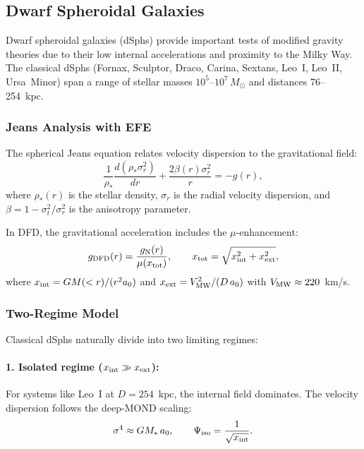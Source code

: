 \subsection{Dwarf Spheroidal Galaxies}\label{sec:galactic-dsph}

Dwarf spheroidal galaxies (dSphs) provide important tests of modified gravity theories due to their low internal accelerations and proximity to the Milky Way. The classical dSphs (Fornax, Sculptor, Draco, Carina, Sextans, Leo~I, Leo~II, Ursa~Minor) span a range of stellar masses $10^5$--$10^7\,M_\odot$ and distances 76--254~kpc.

\subsubsection{Jeans Analysis with EFE}

The spherical Jeans equation relates velocity dispersion to the gravitational field:
\begin{equation}
\frac{1}{\rho_*}\frac{d(\rho_*\sigma_r^2)}{dr} + \frac{2\beta(r)\sigma_r^2}{r} = -g(r),
\end{equation}
where $\rho_*(r)$ is the stellar density, $\sigma_r$ is the radial velocity dispersion, and $\beta = 1 - \sigma_t^2/\sigma_r^2$ is the anisotropy parameter.

In DFD, the gravitational acceleration includes the $\mu$-enhancement:
\begin{equation}
g_{\rm DFD}(r) = \frac{g_{\rm N}(r)}{\mu(x_{\rm tot})}, \qquad x_{\rm tot} = \sqrt{x_{\rm int}^2 + x_{\rm ext}^2},
\end{equation}
where $x_{\rm int} = GM(<r)/(r^2 a_0)$ and $x_{\rm ext} = V_{\rm MW}^2/(D\, a_0)$ with $V_{\rm MW} \approx 220$~km/s.

\subsubsection{Two-Regime Model}

Classical dSphs naturally divide into two limiting regimes:

\paragraph{1. Isolated regime ($x_{\rm int} \gg x_{\rm ext}$):}
For systems like Leo~I at $D = 254$~kpc, the internal field dominates. The velocity dispersion follows the deep-MOND scaling:
\begin{equation}
\sigma^4 \approx GM_*\, a_0, \qquad \Psi_{\rm iso} = \frac{1}{\sqrt{x_{\rm int}}}.
\end{equation}

